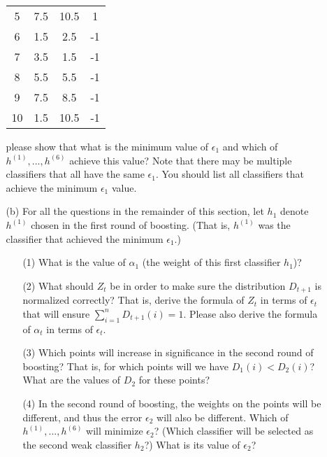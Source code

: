 \documentclass[10pt]{article}
\begin{document}
\begin{enumerate}[1.]
\begin{itemize}
\begin{table}[t]
\begin{tabular}{|c|cc|c|}
                    5 & 7.5 & 10.5 & 1 \\
                    6 & 1.5 & 2.5 & -1 \\
                    7 & 3.5 & 1.5 & -1 \\
                    8 & 5.5 & 5.5 & -1 \\
                    9 & 7.5 & 8.5 & -1 \\
                    10 & 1.5 & 10.5 & -1 \\
                    \hline
                    \end{tabular}
                \end{table}
		        please show that what is the minimum value of $\epsilon_{1}$ and which of $h^{(1)},...,h^{(6)}$ achieve this value? Note that there may be multiple classifiers that all have the same $\epsilon_{1}$. You should list all classifiers that achieve the minimum $\epsilon_{1}$ value.~\\

	        \item[(b)] For all the questions in the remainder of this section, let $h_{1}$ denote $h^{(1)}$ chosen in the first round of boosting. (That is, $h^{(1)}$ was the classifier that achieved the minimum $\epsilon_{1}$.)
		        \begin{enumerate}
			        \item[(1)] What is the value of $\alpha_{1}$ (the weight of this first classifier $h_{1}$)? ~\\

			        \item[(2)] What should $Z_{t}$ be in order to make sure the distribution $D_{t+1}$ is normalized correctly? That is, derive the formula of $Z_{t}$ in terms of $\epsilon_{t}$ that will ensure $\sum_{i=1}^{n} D_{t+1}(i) = 1$. Please also derive the formula of $\alpha_{t}$ in terms of $\epsilon_{t}$. ~\\

			        \item[(3)] Which points will increase in significance in the second round of boosting? That is, for which points will we have $D_{1}(i) < D_{2}(i)$? What are the values of $D_{2}$ for these points?~\\

			        \item[(4)] In the second round of boosting, the weights on the points will be different, and thus the error $\epsilon_2$ will also be different. Which of $h^{(1)}, . . . , h^{(6)}$ will minimize $\epsilon_2$? (Which classifier will be selected as the second weak classifier $h_2$?) What is its value of $\epsilon_2$?~\\


\end{enumerate}
\end{itemize}
\end{enumerate}
\end{document}
